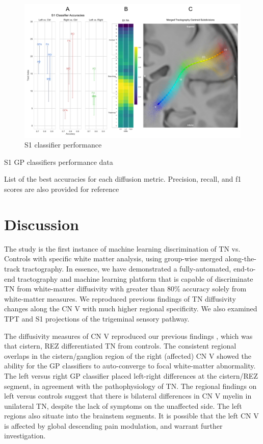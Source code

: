 \begin{figure}[ht]
\centering
\includegraphics[width=\linewidth]{figure-GP-S1.pdf}
\caption{S1 classifier performance}
\label{fig:GPfigure5}
\end{figure}

\begin{table}[ht]
\centering
{}
\caption{S1 GP classifiers performance data}
\caption*{List of the best accuracies for each diffusion metric. Precision, recall, and f1 scores are also provided for reference}
\label{table:s1}
\end{table}

\section{Discussion}
The study is the first instance of machine learning discrimination of TN vs. Controls with specific white matter analysis, using group-wise merged along-the-track tractography. In essence, we have demonstrated a fully-automated, end-to-end tractography and machine learning platform that is capable of discriminate TN from white-matter diffusivity with greater than 80\% accuracy solely from white-matter measures. We reproduced previous findings of TN diffusivity changes along the CN V with much higher regional specificity. We also examined TPT and S1 projections of the trigeminal sensory pathway.

The diffusivity measures of CN V reproduced our previous findings \cite{Chen2016a}, which was that cistern, REZ differentiated TN from controls. The consistent regional overlaps in the cistern/ganglion region of the right (affected) CN V showed the ability for the GP classifiers to auto-converge to focal white-matter abnormality. The left versus right GP classifier placed left-right differences at the cistern/REZ segment, in agreement with the pathophysiology of TN. The regional findings on left versus controls suggest that there is bilateral differences in CN V myelin in unilateral TN, despite the lack of symptoms on the unaffected side. The left regions also situate into the brainstem segments. It is possible that the left CN V is affected by global descending pain modulation, and warrant further investigation. 

